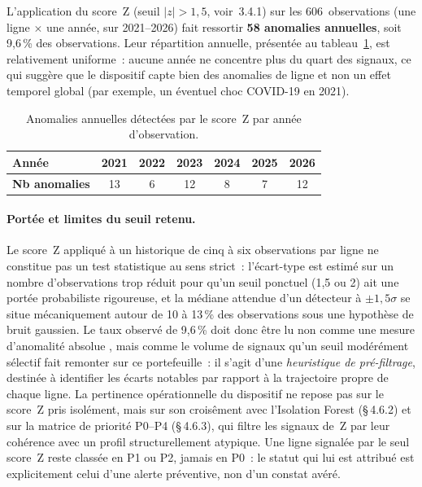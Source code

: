 L'application du score~Z (seuil $|z| > 1{,}5$, voir~3.4.1) sur les 606~observations
(une ligne $\times$ une ann\'ee, sur 2021--2026) fait ressortir \textbf{58 anomalies annuelles}, soit
9{,}6\,\% des observations. Leur r\'epartition annuelle, pr\'esent\'ee au
tableau~\ref{tab:z-per-year}, est relativement uniforme~: aucune ann\'ee ne
concentre plus du quart des signaux, ce qui sugg\`ere que le dispositif capte
bien des \og anomalies de ligne \fg{} et non un effet temporel global (par
exemple, un \'eventuel choc COVID-19 en 2021).

\begin{table}[h]
\centering
\caption{Anomalies annuelles d\'etect\'ees par le score~Z par ann\'ee d'observation.}
\label{tab:z-per-year}
\begin{tabular}{lcccccc}
\toprule
\textbf{Ann\'ee} & 2021 & 2022 & 2023 & 2024 & 2025 & 2026 \\
\midrule
\textbf{Nb anomalies}     & 13   & 6    & 12   & 8    & 7    & 12   \\
\bottomrule
\end{tabular}
\end{table}

\paragraph{Port\'ee et limites du seuil retenu.}
Le score~Z appliqu\'e \`a un historique de cinq \`a six observations par
ligne ne constitue pas un test statistique au sens strict~: l'\'ecart-type
est estim\'e sur un nombre d'observations trop r\'eduit pour qu'un seuil
ponctuel (1{,}5 ou 2) ait une port\'ee probabiliste rigoureuse, et la
m\'ediane attendue d'un d\'etecteur \`a $\pm 1{,}5\sigma$ se situe
m\'ecaniquement autour de 10 \`a 13\,\% des observations sous une
hypoth\`ese de bruit gaussien. Le taux observ\'e de 9{,}6\,\% doit donc
\^etre lu non comme une mesure d'\og anomalit\'e absolue \fg{}, mais comme
le volume de signaux qu'un seuil mod\'er\'ement s\'electif fait remonter
sur ce portefeuille~: il s'agit d'une \emph{heuristique de pr\'e-filtrage},
destin\'ee \`a identifier les \'ecarts notables par rapport \`a la
trajectoire propre de chaque ligne. La pertinence op\'erationnelle du
dispositif ne repose pas sur le score~Z pris isol\'ement, mais sur son
crois\^ement avec l'Isolation Forest (\S\,4.6.2) et sur la matrice de
priorit\'e P0--P4 (\S\,4.6.3), qui filtre les signaux de~Z par leur
coh\'erence avec un profil structurellement atypique. Une ligne signal\'ee
par le seul score~Z reste class\'ee en P1 ou P2, jamais en P0~: le statut
qui lui est attribu\'e est explicitement celui d'une alerte pr\'eventive,
non d'un constat av\'er\'e.

